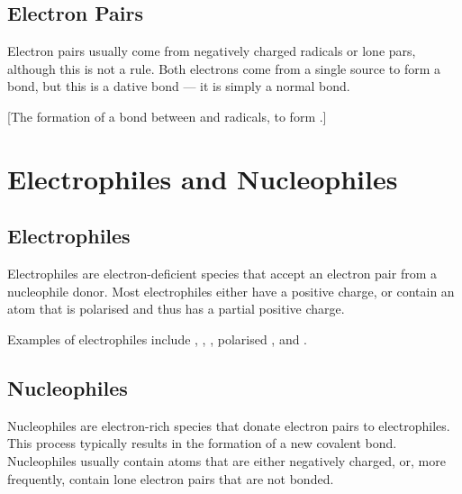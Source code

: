 

		\subsection{Electron Pairs}

			Electron pairs usually come from negatively charged radicals or lone pars, although this is not a rule.
			Both electrons come from a single source to form a bond, but this is  a dative bond --- it is simply a normal
			bond.

			[The formation of a bond between  and \ch{\Cl-} radicals, to form .]



	\pagebreak
	\section{Electrophiles and Nucleophiles}
		\subsection{Electrophiles}

			Electrophiles are electron-deficient species that accept an electron pair from a nucleophile donor. Most electrophiles
			either have a positive charge, or contain an atom that is polarised and thus has a partial positive charge.

			Examples of electrophiles include , , , polarised , and .


		\subsection{Nucleophiles}

			Nucleophiles are electron-rich species that donate electron pairs to electrophiles. This process typically results
			in the formation of a new covalent bond. Nucleophiles usually contain atoms that are either negatively charged, or,
			more frequently, contain lone electron pairs that are not bonded.

